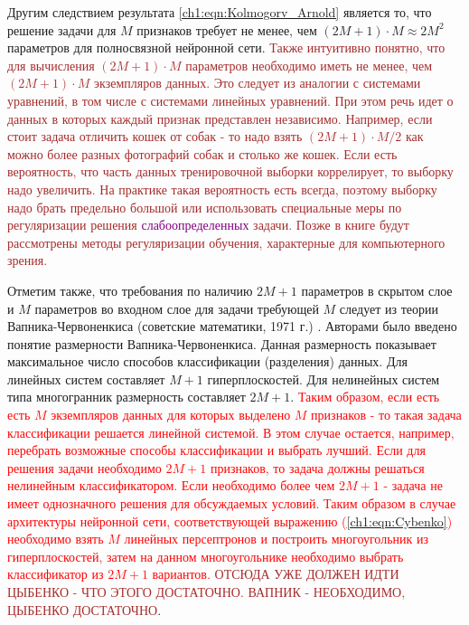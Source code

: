\documentclass[12pt]{article}
\begin{document}
\begin{sloppypar}
Другим следствием результата \ref{ch1:eqn:Kolmogorv_Arnold} является то, что решение задачи для $M$ признаков требует не менее, чем $(2M+1)\cdot M \approx 2M^2$ параметров для полносвязной нейронной сети. 
\textcolor{brown}{Также интуитивно понятно, что для вычисления $(2M+1)\cdot M$ параметров необходимо иметь не менее, чем $(2M+1)\cdot M$ экземпляров данных. Это следует из аналогии с системами уравнений, в том числе с системами линейных уравнений. При этом речь идет о данных в которых каждый признак представлен независимо. Например, если стоит задача отличить кошек от собак - то надо взять $(2M+1)\cdot M/2$ как можно более разных фотографий собак и столько же кошек. Если есть вероятность, что часть данных тренировочной выборки коррелирует, то выборку надо увеличить. На практике такая вероятность есть всегда, поэтому выборку надо брать предельно большой или использовать специальные меры по регуляризации решения \textcolor{purple}{слабоопределенных} задачи. Позже в книге будут рассмотрены методы регуляризации обучения, характерные для компьютерного зрения. } 

Отметим также, что требования по наличию $2M+1$ параметров в скрытом слое и $M$ параметров во входном слое для задачи требующей $M$ следует из теории Вапника-Червоненкиса (советские математики, 1971 г.) \cite{vapnik1971uniform}. 
Авторами было введено понятие размерности Вапника-Червоненкиса. Данная размерность показывает максимальное число способов классификации (разделения) данных.  Для линейных систем составляет $M+1$ гиперплоскостей. Для нелинейных систем типа многогранник размерность составляет $2M+1$. 
\textcolor{red}{
Таким образом, если есть есть $M$ экземпляров данных для которых выделено $M$ признаков - то такая задача классификации решается линейной системой. В этом случае остается, например,  перебрать возможные способы классификации и выбрать лучший. Если для решения задачи необходимо $2M+1$ признаков, то задача должны решаться нелинейным классификатором.
Если необходимо более чем $2M+1$ - задача не имеет однозначного решения для обсуждаемых условий. 
Таким образом в случае архитектуры нейронной сети, соответствующей выражению (\ref{ch1:eqn:Cybenko}) необходимо взять $M$ линейных персептронов и построить многоугольник из гиперплоскостей, затем на данном многоугольнике необходимо выбрать классификатор из $2M+1$ вариантов. }
\textcolor{brown}{
ОТСЮДА УЖЕ ДОЛЖЕН ИДТИ ЦЫБЕНКО - ЧТО ЭТОГО ДОСТАТОЧНО. ВАПНИК - НЕОБХОДИМО, ЦЫБЕНКО ДОСТАТОЧНО}.


\end{sloppypar}
\end{document}
